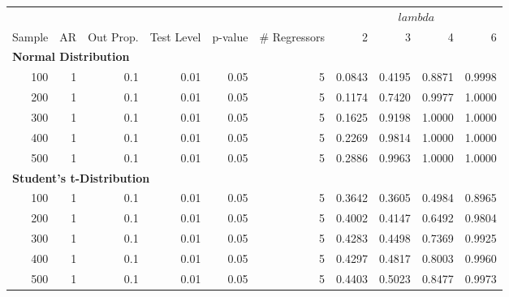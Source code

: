 \begin{table}
\centering
\begin{tabular}{r|r|r|r|r|r|r|r|r|r}
\hline
\multicolumn{6}{c|}{ } & \multicolumn{4}{c}{$lambda$} \\
\cline{7-10}
Sample & AR & Out Prop. & Test Level & p-value & \# Regressors & 2 & 3 & 4 & 6\\
\hline
\multicolumn{10}{l}{\textbf{Normal Distribution}}\\
\hline
\hspace{1em}100 & 1 & 0.1 & 0.01 & 0.05 & 5 & 0.0843 & 0.4195 & 0.8871 & 0.9998\\
\hline
\hspace{1em}200 & 1 & 0.1 & 0.01 & 0.05 & 5 & 0.1174 & 0.7420 & 0.9977 & 1.0000\\
\hline
\hspace{1em}300 & 1 & 0.1 & 0.01 & 0.05 & 5 & 0.1625 & 0.9198 & 1.0000 & 1.0000\\
\hline
\hspace{1em}400 & 1 & 0.1 & 0.01 & 0.05 & 5 & 0.2269 & 0.9814 & 1.0000 & 1.0000\\
\hline
\hspace{1em}500 & 1 & 0.1 & 0.01 & 0.05 & 5 & 0.2886 & 0.9963 & 1.0000 & 1.0000\\
\hline
\multicolumn{10}{l}{\textbf{Student's t-Distribution}}\\
\hline
\hspace{1em}100 & 1 & 0.1 & 0.01 & 0.05 & 5 & 0.3642 & 0.3605 & 0.4984 & 0.8965\\
\hline
\hspace{1em}200 & 1 & 0.1 & 0.01 & 0.05 & 5 & 0.4002 & 0.4147 & 0.6492 & 0.9804\\
\hline
\hspace{1em}300 & 1 & 0.1 & 0.01 & 0.05 & 5 & 0.4283 & 0.4498 & 0.7369 & 0.9925\\
\hline
\hspace{1em}400 & 1 & 0.1 & 0.01 & 0.05 & 5 & 0.4297 & 0.4817 & 0.8003 & 0.9960\\
\hline
\hspace{1em}500 & 1 & 0.1 & 0.01 & 0.05 & 5 & 0.4403 & 0.5023 & 0.8477 & 0.9973\\
\hline
\end{tabular}
\end{table}
